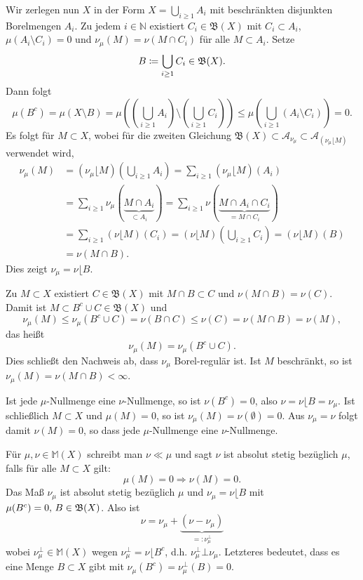 \documentclass[a4paper,twoside,DIV15,BCOR12mm]{scrbook}
\newcommand{\borel}{\mathfrak B}
\newcommand{\MR}{\lfloor}
\begin{document}
\begin{beweis}
Wir zerlegen nun $X$ in der Form $X=\bigcup_{i\ge 1}A_i$ mit beschränkten disjunkten Borelmengen $A_i$. 
Zu jedem $i\in\mathbb{N}$ existiert $C_i\in \borel(X)$ mit $C_i\subset A_i$, $\mu(A_i\setminus C_i)=0$ und  $\nu_\mu(M)=\nu(M\cap C_i)$ für alle $M\subset A_i$. Setze 
$$B\da \bigcup_{i\ge 1}C_i\in \borel(X).$$
Dann folgt
$$
\mu(B^c)=\mu(X\setminus B)=\mu((\bigcup_{i\ge 1}A_i) \setminus(\bigcup_{i\ge 1}C_i))\le\mu(\bigcup_{i\ge 1}(A_i\setminus C_i))=0.
$$
Es folgt für $M\subset X$, wobei für die zweiten Gleichung $\borel (X)\subset\mathcal{A}_{\nu_\mu}\subset
\mathcal{A}_{(\nu_\mu\MR M)}$ verwendet wird,
\begin{align*}
\nu_\mu(M)&=(\nu_\mu\MR M)(\bigcup_{i\ge 1}A_i)=\sum_{i\ge 1}(\nu_\mu\MR M)(A_i)\\
&=\sum_{i\ge 1}\nu_\mu(\underbrace{M\cap A_i}_{\subset A_i})=\sum_{i\ge 1}\nu(\underbrace{M\cap A_i\cap C_i}_{=M\cap C_i})\\
&=\sum_{i\ge 1}(\nu\MR M)(C_i)=(\nu\MR M)(\bigcup_{i\ge 1} C_i)=(\nu\MR M)(B)\\
&=\nu(M\cap B).
\end{align*}
Dies zeigt $\nu_\mu=\nu\MR B$.

Zu $M\subset X$ existiert $C\in\borel (X)$ mit $M\cap B\subset C$ und $\nu(M\cap B)=\nu(C)$. Damit ist 
$M\subset B^c\cup C\in \borel(X)$ und
$$
\nu_\mu(M)\le \nu_\mu(B^c\cup C)=\nu(B\cap C)\le\nu(C)=\nu(M\cap B)=\nu(M),
$$
das heißt
$$
\nu_\mu(M)=\nu_\mu(B^c\cup C).
$$
Dies schließt den Nachweis ab, dass $\nu_\mu$ Borel-regulär ist. Ist  $M$ beschränkt, 
so ist $\nu_\mu(M)=\nu(M\cap B)<\infty$. 

Ist jede $\mu$-Nullmenge eine $\nu$-Nullmenge, so ist $\nu(B^c)=0$, 
also $\nu=\nu\MR B=\nu_\mu$. Ist schließlich $M\subset X$ und $\mu(M)=0$, so ist 
$\nu_\mu(M)=\nu(\emptyset)=0$. Aus $\nu_\mu=\nu$ folgt damit $\nu(M)=0$, so dass jede $\mu$-Nullmenge  eine $\nu$-Nullmenge.
\end{beweis}

\begin{bemerkung}
Für \(\mu, \nu \in \mathbb{M}(X)\) schreibt man \(\nu \ll \mu\) und sagt \(\nu\) ist absolut stetig bezüglich \(\mu\), falls für alle \(M \subset X\) gilt: 
\[
\mu(M) = 0 \Rightarrow \nu(M) = 0.
\]
Das Maß \(\nu_\mu\) ist absolut stetig bezüglich \(\mu\) und \(\nu_\mu = \nu\MR B\) mit \(\mu(B^c) = 0,$ $B \in \borel(X)\). Also ist
\[
\nu = \nu_\mu + \underbrace{(\nu - \nu_\mu)}_{=: \nu_\mu^\bot}
\]
wobei \(\nu_\mu^\bot \in \mathbb{M}(X)\) wegen \(\nu_\mu^\bot = \nu\MR B^c\), d.h. \(\nu_\mu^\bot \bot \nu_\mu \). 
Letzteres bedeutet, dass es eine Menge $B\subset X$ gibt mit \(\nu_\mu(B^c) = \nu_\mu^\bot(B) = 0\).
\end{bemerkung}
\end{document}
